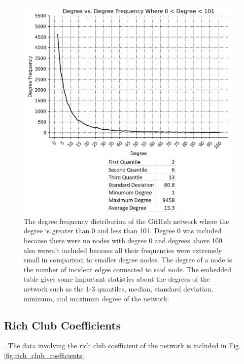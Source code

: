 \documentclass[9pt,twocolumn,twoside]{pnas-new}
\begin{document}
\begin{figure}
\centering
\includegraphics[width=.8\linewidth]{degree_frequencies}
\caption{The degree frequency distribution of the GitHub network where the degree is greater than 0 and less than 101. Degree 0 was included because there were no nodes with degree 0 and degrees above 100 also weren't included because all their frequencies were extremely small in comparison to smaller degree nodes. The degree of a node is the number of incident edges connected to said node. The embedded table gives some important statistics about the degrees of the network such as the 1-3 quantiles, median, standard deviation, minimum, and maximum degree of the network.
}
\label{fig:degree_frequencies}
\end{figure}

\subsection*{Rich Club Coefficients}. The data involving the rich club coefficient of the network is included in Fig. \ref{fig:rich_club_coefficients}.
\end{document}
